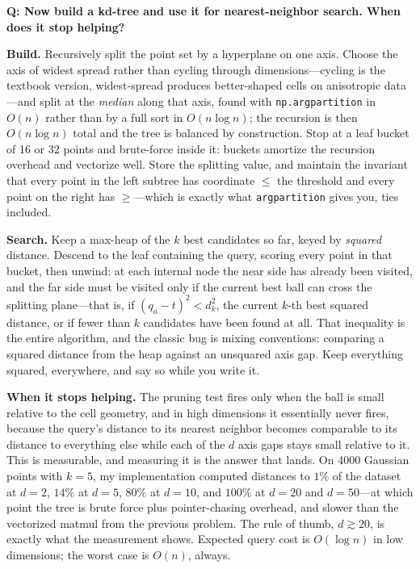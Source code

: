 \begin{interviewq}
\textbf{Q: Now build a kd-tree and use it for nearest-neighbor search. When does it stop helping?}

 \quad {} \quad \badgefreq{\freqmed}

\stronganswer

\textbf{Build.} Recursively split the point set by a hyperplane on one axis. Choose the axis of widest spread rather than cycling through dimensions---cycling is the textbook version, widest-spread produces better-shaped cells on anisotropic data---and split at the \emph{median} along that axis, found with \texttt{np.argpartition} in $O(n)$ rather than by a full sort in $O(n \log n)$; the recursion is then $O(n \log n)$ total and the tree is balanced by construction. Stop at a leaf bucket of 16 or 32 points and brute-force inside it: buckets amortize the recursion overhead and vectorize well. Store the splitting value, and maintain the invariant that every point in the left subtree has coordinate $\le$ the threshold and every point on the right has $\ge$---which is exactly what \texttt{argpartition} gives you, ties included.

\textbf{Search.} Keep a max-heap of the $k$ best candidates so far, keyed by \emph{squared} distance. Descend to the leaf containing the query, scoring every point in that bucket, then unwind: at each internal node the near side has already been visited, and the far side must be visited only if the current best ball can cross the splitting plane---that is, if $(q_a - t)^2 < d_k^2$, the current $k$-th best squared distance, or if fewer than $k$ candidates have been found at all. That inequality is the entire algorithm, and the classic bug is mixing conventions: comparing a squared distance from the heap against an unsquared axis gap. Keep everything squared, everywhere, and say so while you write it.

\textbf{When it stops helping.} The pruning test fires only when the ball is small relative to the cell geometry, and in high dimensions it essentially never fires, because the query's distance to its nearest neighbor becomes comparable to its distance to everything else while each of the $d$ axis gaps stays small relative to it. This is measurable, and measuring it is the answer that lands. On 4000 Gaussian points with $k = 5$, my implementation computed distances to $1\%$ of the dataset at $d = 2$, $14\%$ at $d = 5$, $80\%$ at $d = 10$, and $100\%$ at $d = 20$ and $d = 50$---at which point the tree is brute force plus pointer-chasing overhead, and slower than the vectorized matmul from the previous problem. The rule of thumb, $d \gtrsim 20$, is exactly what the measurement shows. Expected query cost is $O(\log n)$ in low dimensions; the worst case is $O(n)$, always.


\end{interviewq}
